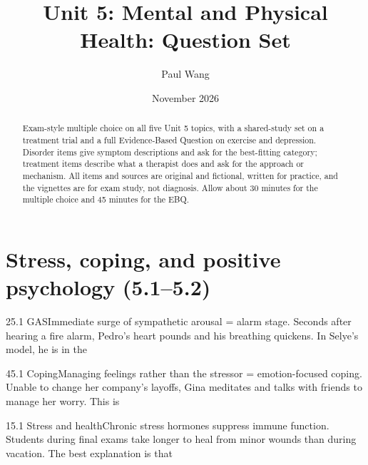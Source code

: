 \documentclass[11pt]{article}
\title{Unit 5: Mental and Physical Health: Question Set}
\author{Paul Wang}
\date{November 2026}
\begin{document}
\maketitle

\begin{abstract}
Exam-style multiple choice on all five Unit 5 topics, with a shared-study set on a treatment trial and a full Evidence-Based Question on exercise and depression. Disorder items give symptom descriptions and ask for the best-fitting category; treatment items describe what a therapist does and ask for the approach or mechanism. All items and sources are original and fictional, written for practice, and the vignettes are for exam study, not diagnosis. Allow about 30 minutes for the multiple choice and 45 minutes for the EBQ.
\end{abstract}


\section{Stress, coping, and positive psychology (5.1--5.2)}

\begin{q}{2}{5.1 GAS}{Immediate surge of sympathetic arousal = alarm stage.}
Seconds after hearing a fire alarm, Pedro's heart pounds and his breathing quickens. In Selye's model, he is in the
\end{q}

\begin{q}{4}{5.1 Coping}{Managing feelings rather than the stressor = emotion-focused coping.}
Unable to change her company's layoffs, Gina meditates and talks with friends to manage her worry. This is
\end{q}

\begin{q}{1}{5.1 Stress and health}{Chronic stress hormones suppress immune function.}
Students during final exams take longer to heal from minor wounds than during vacation. The best explanation is that
\end{q}
\end{document}
